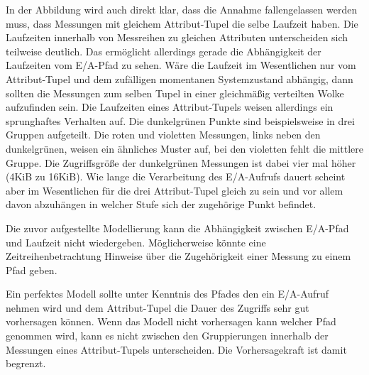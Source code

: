 \documentclass[
	12pt,
	a4paper,
	BCOR10mm,
	DIV14,
	listof=totoc,
	bibliography=totoc,
	headsepline
]{scrreprt}
\begin{document}
In der Abbildung wird auch direkt klar, dass die Annahme fallengelassen werden muss, dass Messungen mit gleichem Attribut-Tupel die selbe Laufzeit haben. Die Laufzeiten innerhalb von Messreihen zu gleichen Attributen unterscheiden sich teilweise deutlich.
Das ermöglicht allerdings gerade die Abhängigkeit der Laufzeiten vom E/A-Pfad zu sehen.
Wäre die Laufzeit im Wesentlichen nur vom Attribut-Tupel und dem \glqq zufälligen\grqq{} momentanen Systemzustand abhängig, dann sollten die Messungen zum selben Tupel in einer gleichmäßig verteilten Wolke aufzufinden sein.
Die Laufzeiten eines Attribut-Tupels weisen allerdings ein sprunghaftes Verhalten auf. Die dunkelgrünen Punkte sind beispielsweise in drei Gruppen aufgeteilt.
Die roten und violetten Messungen, links neben den dunkelgrünen, weisen ein ähnliches Muster auf, bei den violetten fehlt die mittlere Gruppe.
Die Zugriffsgröße der dunkelgrünen Messungen ist dabei vier mal höher (4KiB zu 16KiB).
Wie lange die Verarbeitung des E/A-Aufrufs dauert scheint aber im Wesentlichen für die drei Attribut-Tupel gleich zu sein und vor allem davon abzuhängen in welcher Stufe sich der zugehörige Punkt befindet.
\medskip

Die zuvor aufgestellte Modellierung kann die Abhängigkeit zwischen E/A-Pfad und Laufzeit nicht wiedergeben. Möglicherweise könnte eine Zeitreihenbetrachtung Hinweise über die Zugehörigkeit einer Messung zu einem Pfad geben. 

Ein perfektes Modell sollte unter Kenntnis des Pfades den ein E/A-Aufruf nehmen wird und dem Attribut-Tupel die Dauer des Zugriffs sehr gut vorhersagen können. Wenn das Modell nicht vorhersagen kann welcher Pfad genommen wird, kann es nicht zwischen den Gruppierungen innerhalb der Messungen eines Attribut-Tupels unterscheiden. Die Vorhersagekraft ist damit begrenzt.
\end{document}

